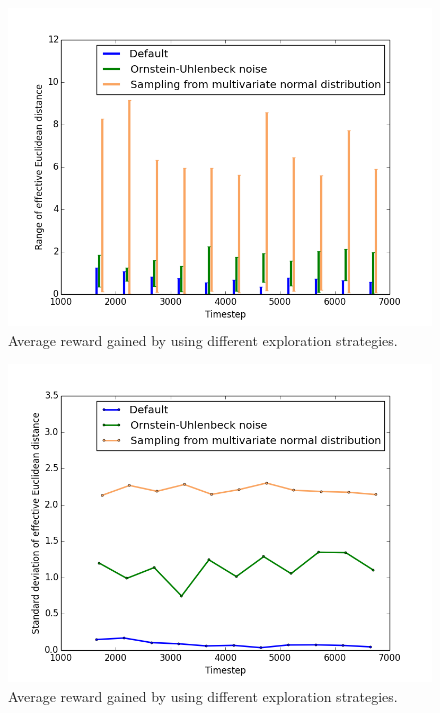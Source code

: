 \documentclass{article}
\begin{document}
\begin{figure}
\begin{center}
\includegraphics[scale=0.4]{action_exploration_range}
\end{center}
\caption{Average reward gained by using different exploration strategies.}
\label{fig:action_exploration_range}
\end{figure}

\begin{figure}
\begin{center}
\includegraphics[scale=0.4]{action_exploration_std_dev}
\end{center}
\caption{Average reward gained by using different exploration strategies.}
\label{fig:action_exploration_std_dev}
\end{figure}
\end{document}
